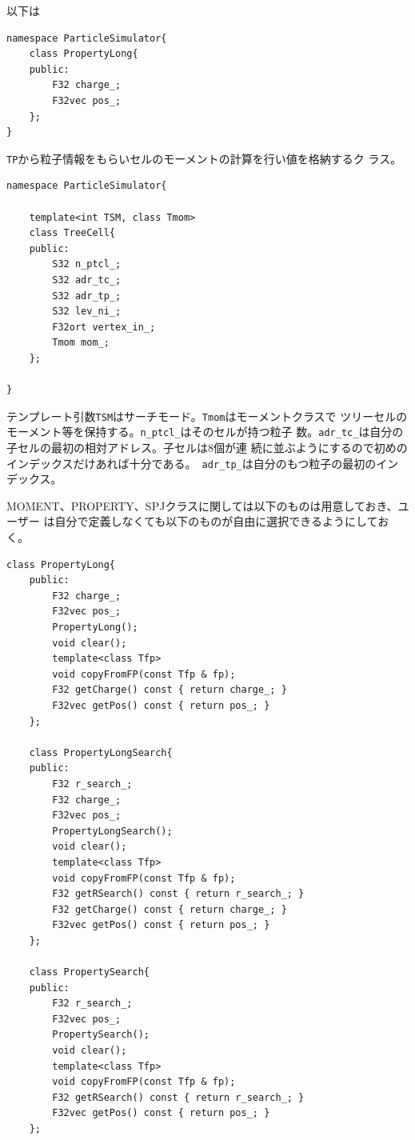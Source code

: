 以下は

\begin{lstlisting}[caption=カットオフなし単極子重力]
namespace ParticleSimulator{
    class PropertyLong{
    public:
        F32 charge_;
        F32vec pos_;
    };
}
\end{lstlisting}




{\tt TP}から粒子情報をもらいセルのモーメントの計算を行い値を格納するク
ラス。

\begin{lstlisting}[caption=TreeCell]
namespace ParticleSimulator{

    template<int TSM, class Tmom>
    class TreeCell{
    public:
        S32 n_ptcl_;
        S32 adr_tc_;
        S32 adr_tp_;
        S32 lev_ni_;
        F32ort vertex_in_;
        Tmom mom_;
    };

}
\end{lstlisting}

テンプレート引数{\tt TSM}はサーチモード。{\tt Tmom}はモーメントクラスで
ツリーセルのモーメント等を保持する。{\tt n\_ptcl\_}はそのセルが持つ粒子
数。{\tt adr\_tc\_}は自分の子セルの最初の相対アドレス。子セルは8個が連
続に並ぶようにするので初めのインデックスだけあれば十分である。{\tt
adr\_tp\_}は自分のもつ粒子の最初のインデックス。

MOMENT、PROPERTY、SPJクラスに関しては以下のものは用意しておき、ユーザー
は自分で定義しなくても以下のものが自由に選択できるようにしておく。

\begin{lstlisting}[caption=プロパティクラス]
    class PropertyLong{
    public:
        F32 charge_;
        F32vec pos_;
        PropertyLong();
        void clear();
        template<class Tfp>
        void copyFromFP(const Tfp & fp);
        F32 getCharge() const { return charge_; }
        F32vec getPos() const { return pos_; }
    };

    class PropertyLongSearch{
    public:
        F32 r_search_;
        F32 charge_;
        F32vec pos_;
        PropertyLongSearch();
        void clear();
        template<class Tfp>
        void copyFromFP(const Tfp & fp);
        F32 getRSearch() const { return r_search_; }
        F32 getCharge() const { return charge_; }
        F32vec getPos() const { return pos_; }
    };

    class PropertySearch{
    public:
        F32 r_search_;
        F32vec pos_;
        PropertySearch();
        void clear();
        template<class Tfp>
        void copyFromFP(const Tfp & fp);
        F32 getRSearch() const { return r_search_; }
        F32vec getPos() const { return pos_; }
    };
\end{lstlisting}


